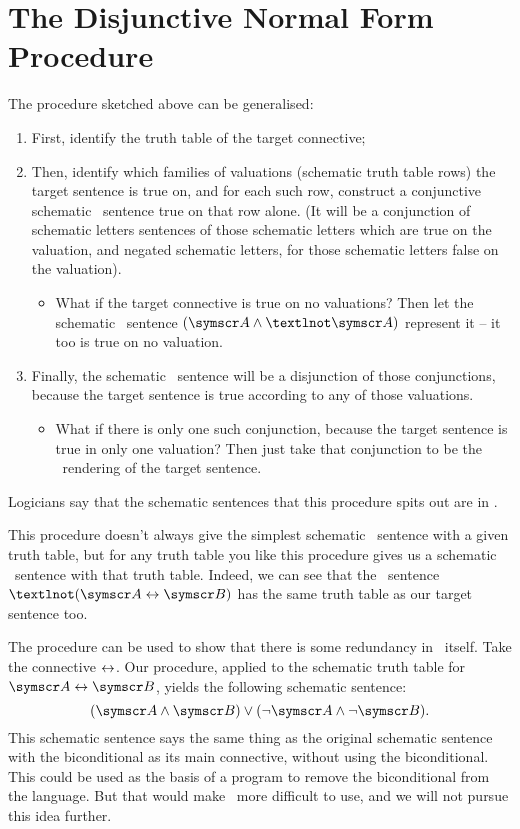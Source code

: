 \section{The Disjunctive Normal Form Procedure}


The procedure sketched above can be generalised: \begin{enumerate}
	\item First, identify the truth table of the target connective;
	\item Then, identify which families of valuations (schematic truth table rows) the target sentence is true on, and for each such row, construct a conjunctive schematic \TFL\ sentence true on that row alone. (It will be a conjunction of schematic letters sentences of those schematic letters which are true on the valuation, and negated schematic letters, for those schematic letters false on the valuation). \begin{itemize}
		\item What if the target connective is true on no valuations? Then let the schematic \TFL\ sentence $(\meta{A} \wedge ¬\meta{A})$ represent it – it too is true on no valuation.
	\end{itemize}
	\item Finally, the schematic \TFL\ sentence will be a disjunction of those conjunctions, because the target sentence is true according to any of those valuations. \begin{itemize}
		\item What if there is only one such conjunction, because the target sentence is true in only one valuation? Then just take that conjunction to be the \TFL\ rendering of the target sentence.
	\end{itemize}
\end{enumerate}  
Logicians say that the schematic sentences that this procedure spits out are in .


This procedure doesn't always give the simplest schematic \TFL\ sentence with a given truth table, but for any truth table you like this procedure gives us a schematic \TFL\ sentence with that truth table. Indeed, we can see that the \TFL\ sentence $¬(\meta{A} \eiff \meta{B})$ has the same truth table as our target sentence too.

The procedure can be used to show that there is some redundancy in \TFL\ itself. Take the connective $\leftrightarrow$. Our procedure, applied to the schematic truth table for $\meta{A}\eiff\meta{B}$, yields the following schematic sentence: \[(\meta{A}\eand\meta{B})\eor(\enot\meta{A}\eand\enot\meta{B}).\] This schematic sentence says the same thing as the original schematic sentence with the biconditional as its main connective, without using the biconditional. This could be used as the basis of a program to remove the biconditional from the language. But that would make \TFL\ more difficult to use, and we will not pursue this idea further.

